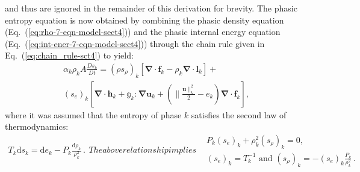 \documentclass[preprint,10pt]{elsarticle}
\renewcommand{\div}{\mbold{\nabla}\! \cdot \!}
\newcommand{\grad}{\mbold{\nabla}}
\newcommand{\mbold}[1]{\boldsymbol#1}
\newcommand{\eqt}[1]{Eq.~(\ref{#1})}                     %
\begin{document}
and thus are ignored in the remainder of this derivation for brevity. The phasic entropy equation is now obtained by combining the phasic density equation (\eqt{eq:rho-7-eqn-model-sect4}) and the phasic internal energy equation (\eqt{eq:int-ener-7-eqn-model-sect4}) through the chain rule given in \eqt{eq:chain_rule-sct4} to yield:
%
\begin{multline}\label{eq:ent-res-7-eqn-diss-terms}
\alpha_k \rho_k A \frac{Ds_k}{Dt} =  (\rho s_\rho)_k \left[ \div \mbold f_k - \rho_k \div \mbold l_k \right] + \\
\left(s_e\right)_k \left[ \div \mbold h_k + \mathbb{g}_k : \grad \mbold u_k +  \left( \| \frac{\mbold u \|^2_k}{2} - e_k\right) \div \mbold f_k  \right],
\end{multline}
%
where it was assumed that the entropy of phase $k$ satisfies the second law of thermodynamics: 
%
\begin{subequations}
\begin{align}\label{eq:2nd-therm-laws-sect4}
T_k \text{d} s_k = \text{d}e_k - P_k\frac{\text{d}\rho_k}{\rho_k^2} \,.
\end{align}
The above relationship implies 
\begin{align}
&P_k (s_e)_k + \rho_k^2 (s_\rho)_k = 0, \\
&(s_e)_k = T_k^{-1} \text{ and } (s_\rho)_k = - (s_e)_k \frac{P_k }{\rho_k^2} \,. \nonumber
\end{align}
\end{subequations}
% 
\end{document}
